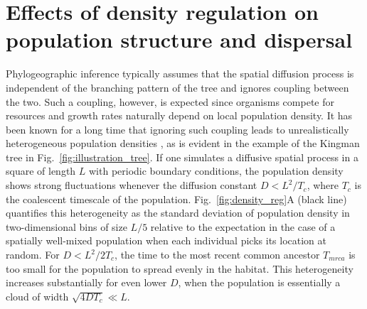 \documentclass[aps,rmp, twocolumn]{revtex4}
\begin{document}
\section*{Effects of density regulation on population structure and dispersal}
Phylogeographic inference typically assumes that the spatial diffusion process is independent of the branching pattern of the tree and ignores coupling between the two.
Such a coupling, however, is expected since organisms compete for resources and growth rates naturally depend on local population density.
It has been known for a long time that ignoring such coupling leads to unrealistically heterogeneous population densities \citep{felsenstein_pain_1975}, as is evident in the example of the Kingman tree in Fig.~\ref{fig:illustration_tree}.
If one simulates a diffusive spatial process in a square of length $L$ with periodic boundary conditions, the population density shows strong fluctuations whenever the diffusion constant $D<L^2/T_c$, where $T_c$ is the coalescent timescale of the population.
Fig.~\ref{fig:density_reg}A (black line) quantifies this heterogeneity as the standard deviation of population density in two-dimensional bins of size $L/5$ relative to the expectation in the case of a spatially well-mixed population when each individual picks its location at random.
For $D<L^2/2T_c$, the time to the most recent common ancestor $T_{mrca}$ is too small for the population to spread evenly in the habitat.
This heterogeneity increases substantially for even lower $D$, when the population is essentially a cloud of width $\sqrt{4DT_c}\ll L$.
\end{document}
